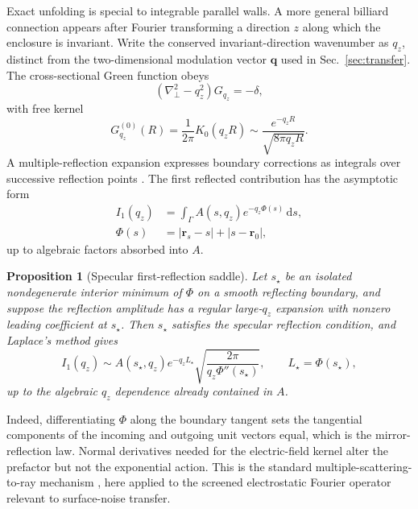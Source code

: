 \documentclass[aps,pra,twocolumn,superscriptaddress,longbibliography,nofootinbib,floatfix]{revtex4-2}
\newtheorem{proposition}{Proposition}
\theoremstyle{remark}
\newcommand{\dd}{\mathrm d}
\newcommand{\qvec}{\bm q}
\begin{document}
Exact unfolding is special to integrable parallel walls.  A more general billiard connection appears after Fourier transforming a direction $z$ along which the enclosure is invariant.  Write the conserved invariant-direction wavenumber as $q_z$, distinct from the two-dimensional modulation vector $\qvec$ used in Sec.~\ref{sec:transfer}.  The cross-sectional Green function obeys
\begin{equation}
(\nabla_\perp^2-q_z^2)G_{q_z}=-\delta,
\end{equation}
with free kernel
\begin{equation}
G_{q_z}^{(0)}(R)=\frac{1}{2\pi}K_0(q_zR)
\sim\frac{e^{-q_zR}}{\sqrt{8\pi q_zR}}.
\label{eq:K0asym}
\end{equation}
A multiple-reflection expansion expresses boundary corrections as integrals over successive reflection points \cite{BalianBloch1970,Bordag2001}.  The first reflected contribution has the asymptotic form
\begin{align}
I_1(q_z)&=\int_\Gamma A(s,q_z)e^{-q_z\Phi(s)}\,\dd s,\nonumber\\
\Phi(s)&=|\bm r_s-s|+|s-\bm r_0|,
\label{eq:I1}
\end{align}
up to algebraic factors absorbed into $A$.

\begin{proposition}[Specular first-reflection saddle]
Let $s_\star$ be an isolated nondegenerate interior minimum of $\Phi$ on a smooth reflecting boundary, and suppose the reflection amplitude has a regular large-$q_z$ expansion with nonzero leading coefficient at $s_\star$.  Then $s_\star$ satisfies the specular reflection condition, and Laplace's method gives
\begin{equation}
I_1(q_z)\sim A(s_\star,q_z)e^{-q_zL_\star}
\sqrt{\frac{2\pi}{q_z\Phi''(s_\star)}},
\qquad L_\star=\Phi(s_\star),
\label{eq:saddle}
\end{equation}
up to the algebraic $q_z$ dependence already contained in $A$.
\end{proposition}

Indeed, differentiating $\Phi$ along the boundary tangent sets the tangential components of the incoming and outgoing unit vectors equal, which is the mirror-reflection law.  Normal derivatives needed for the electric-field kernel alter the prefactor but not the exponential action.  This is the standard multiple-scattering-to-ray mechanism \cite{BalianBloch1972,BalianDuplantier1977,Zelditch2004}, here applied to the screened electrostatic Fourier operator relevant to surface-noise transfer.
\end{document}
